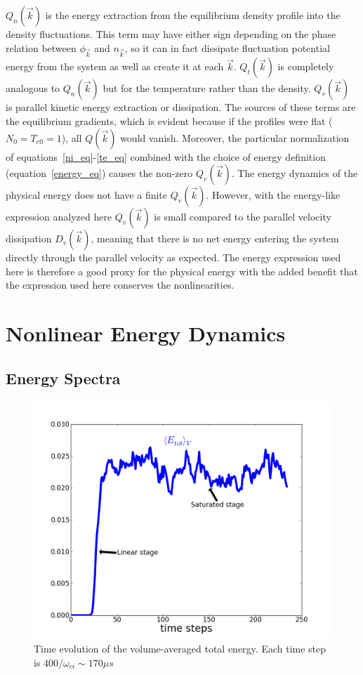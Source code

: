 \documentclass[showpacs,preprintnumbers,amsmath,amssymb,superscriptaddress,aip]{revtex4-1}
\begin{document}
$Q_n(\vec{k})$ is the energy extraction from the equilibrium density profile into the density fluctuations. 
This term may have either sign depending on the phase relation between $\phi_{\vec{k}}$ and $n_{\vec{k}}$, 
so it can in fact dissipate fluctuation potential energy from the system as well as create it
at each $\vec{k}$. $Q_t(\vec{k})$ is completely analogous to $Q_n(\vec{k})$ but for the temperature rather than the density. 
$Q_v(\vec{k})$ is parallel kinetic energy extraction or dissipation.
The sources of these terms are the equilibrium gradients, which is evident because if the profiles
were flat ($N_0=T_{e0}=1$), all $Q(\vec{k})$ would vanish.
Moreover, the particular normalization of equations~\ref{ni_eq}-\ref{te_eq} combined with the choice of energy definition (equation~\ref{energy_eq}) causes the non-zero $Q_v(\vec{k})$.
The energy dynamics of the physical energy does not have a finite $Q_v(\vec{k})$. However, with the energy-like expression analyzed here $Q_v(\vec{k})$ is small compared to the 
parallel velocity dissipation $D_v(\vec{k})$, meaning that there is no net energy entering the system directly through the parallel velocity as expected. 
The energy expression used here is therefore a good proxy for the physical energy with the added benefit that the expression used here conserves the nonlinearities.


\section{Nonlinear Energy Dynamics}
\label{nl_en_dynamics_sec}

\subsection{Energy Spectra}

\begin{figure}[!htbp]
\includegraphics[]{time_evolution}
\hfil
\caption{Time evolution of the volume-averaged total energy. Each time step is $400/\omega_{ci} \sim 170 \mu s$}
\label{time_evolution}
\end{figure}
\end{document}
